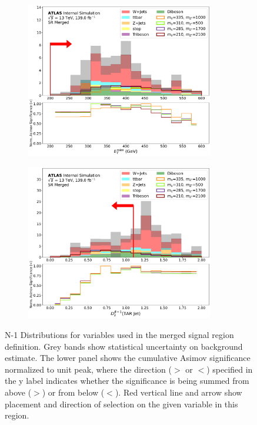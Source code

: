 \begin{figure}[htbp]
\begin{subfigure}[t]{0.48\textwidth}
    \caption{\metsig}
    \end{subfigure}
    \begin{subfigure}[t]{0.48\textwidth}
    \centering
     \includegraphics[width = 0.9\textwidth]{Figures/5/SR1L_Merged/MetTST_met_normSig_N_1.pdf}
    \caption{\met}
    \end{subfigure}
    \begin{subfigure}[t]{0.48\textwidth}
    \centering
     \includegraphics[width = 0.9\textwidth]{Figures/5/SR1L_Merged/TARJets10_TAR_D20_normSig_N_1.pdf}
    \caption{\DtwoTAR}
    \end{subfigure}
   \caption{N-1 Distributions for variables used in the merged signal region definition. Grey bands show statistical uncertainty on background estimate. The lower panel shows the cumulative Asimov significance normalized to unit peak, where the direction (\(>\) or \(<\)) specified in the y label indicates whether the significance is being summed from above (\(>\)) or from below (\(<\)). Red vertical line and arrow show placement and direction of selection on the given variable in this region.}
   \label{fig:Nminus1mergedSR_app}
\end{figure}
  
